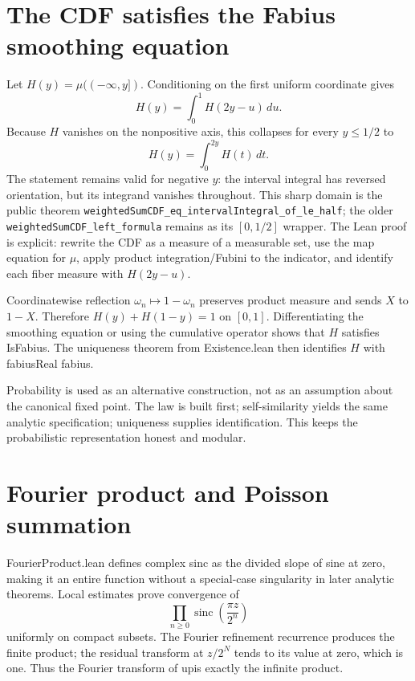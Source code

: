 \documentclass[11pt,a4paper,openany]{book}
\def\module#1{#1.lean}
\def\decl#1{#1}
\def\upfun{up}
\newcommand{\upfun}{\ensuremath{\operatorname{up}}}
\newcommand{\module}[1]{\nolinkurl{#1.lean}}
\newcommand{\decl}[1]{\texttt{\detokenize{#1}}}
\newcommand{\pathbreak}[1]{\nolinkurl{#1}}
\begin{document}
\section{The CDF satisfies the Fabius smoothing equation}
Let $H(y)=\mu(( -\infty,y])$.  Conditioning on the first uniform coordinate
gives
\[
 H(y)=\int_0^1 H(2y-u)\,du.
\]
Because $H$ vanishes on the nonpositive axis, this collapses for every
$y\leq1/2$ to
\[
 H(y)=\int_0^{2y}H(t)\,dt.
\]
The statement remains valid for negative $y$: the interval integral has
reversed orientation, but its integrand vanishes throughout.  This sharp
domain is the public theorem
\pathbreak{weightedSumCDF_eq_intervalIntegral_of_le_half}; the older
\pathbreak{weightedSumCDF_left_formula} remains as its $[0,1/2]$ wrapper.
The Lean proof is explicit: rewrite the CDF as a measure of a measurable set,
use the map equation for $\mu$, apply product integration/Fubini to the
indicator, and identify each fiber measure with $H(2y-u)$.

Coordinatewise reflection $\omega_n\mapsto1-\omega_n$ preserves product
measure and sends $X$ to $1-X$.  Therefore $H(y)+H(1-y)=1$ on $[0,1]$.
Differentiating the smoothing equation or using the cumulative operator shows
that $H$ satisfies \decl{IsFabius}.  The uniqueness theorem from
\module{Existence} then identifies $H$ with \decl{fabiusReal fabius}.

\begin{proofidea}
Probability is used as an alternative construction, not as an assumption about
the canonical fixed point.  The law is built first; self-similarity yields the
same analytic specification; uniqueness supplies identification.  This keeps
the probabilistic representation honest and modular.
\end{proofidea}

\section{Fourier product and Poisson summation}
\module{FourierProduct} defines complex sinc as the divided slope of sine at
zero, making it an entire function without a special-case singularity in later
analytic theorems.  Local estimates prove convergence of
\[
 \prod_{n\ge0}\operatorname{sinc}
     \!\left(\frac{\pi z}{2^n}\right)
\]
uniformly on compact subsets.  The Fourier refinement recurrence produces the
finite product; the residual transform at $z/2^N$ tends to its value at zero,
which is one.  Thus the Fourier transform of \upfun is exactly the infinite
product.
\end{document}
